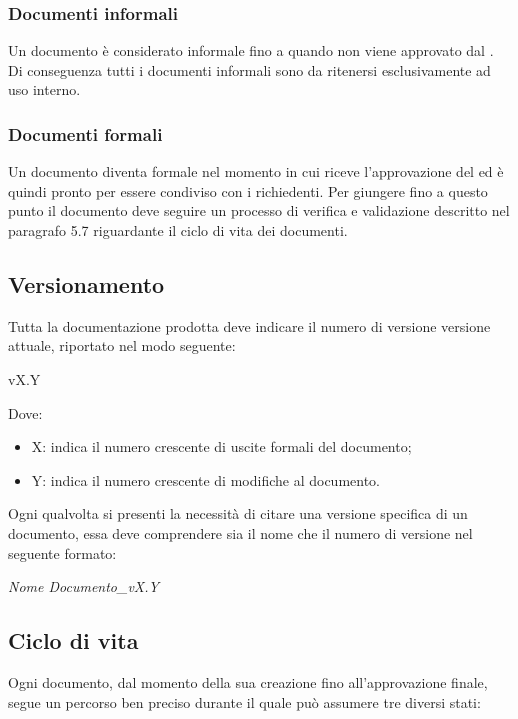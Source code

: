 \subsubsection{Documenti informali}
Un documento è considerato informale fino a quando non viene approvato dal \ruoloResponsabile. Di conseguenza tutti i documenti informali sono da ritenersi esclusivamente ad uso interno.

\subsubsection{Documenti formali}
Un documento diventa formale nel momento in cui riceve l'approvazione del \ruoloResponsabile{} ed è quindi pronto per essere condiviso con i richiedenti.
Per giungere fino a questo punto il documento deve seguire un processo di verifica e validazione descritto nel paragrafo 5.7 riguardante il ciclo di vita dei documenti.

\subsection{Versionamento}
Tutta la documentazione prodotta deve indicare il numero di versione versione attuale, riportato nel modo seguente:
\begin{center}
vX.Y
\end{center}
Dove:
\begin{itemize}
\item X: indica il numero crescente di uscite formali del documento;
\item Y: indica il numero crescente di modifiche al documento.
\end{itemize}
Ogni qualvolta si presenti la necessità di citare una versione specifica di un documento, essa
deve comprendere sia il nome che il numero di versione nel seguente formato:
\begin{center}
\textit{Nome Documento\_vX.Y}
\end{center}

\subsection{Ciclo di vita}
Ogni documento, dal momento della sua creazione fino all'approvazione finale, segue un percorso ben preciso durante il quale può assumere tre diversi stati:


